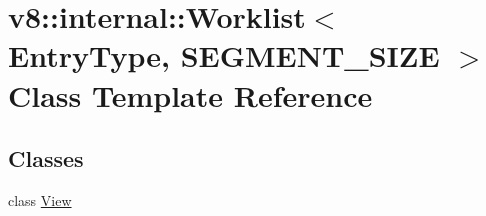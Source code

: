 \hypertarget{classv8_1_1internal_1_1Worklist}{}\section{v8\+:\+:internal\+:\+:Worklist$<$ Entry\+Type, S\+E\+G\+M\+E\+N\+T\+\_\+\+S\+I\+ZE $>$ Class Template Reference}
\label{classv8_1_1internal_1_1Worklist}
\subsection*{Classes}
\begin{DoxyCompactItemize}
\item 
class \mbox{\hyperlink{classv8_1_1internal_1_1Worklist_1_1View}{View}}
\end{DoxyCompactItemize}
